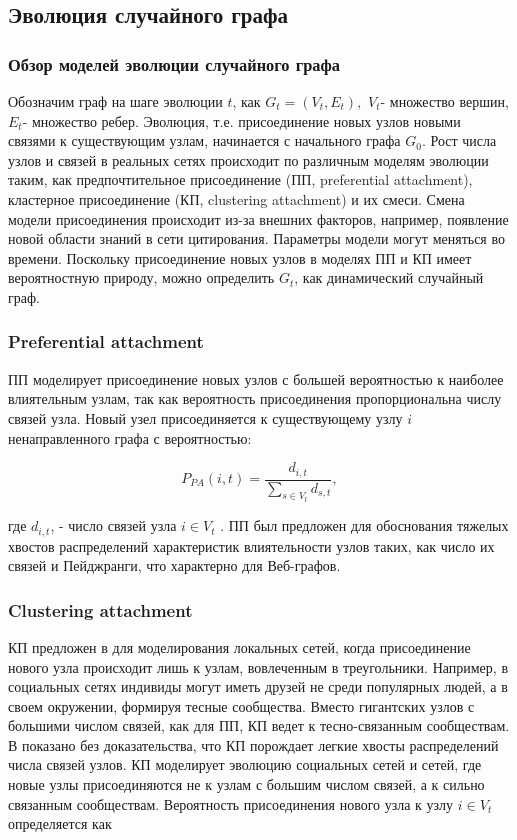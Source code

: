 \documentclass[a4paper,12pt]{article}
\begin{document}
\subsection{Эволюция случайного графа}
\subsubsection{Обзор моделей эволюции случайного графа}
	Обозначим граф на шаге эволюции $t$, как $G_{t}=(V_{t},E_{t}),$ $V_{t}$- множество вершин, $E_{t}$- множество ребер. Эволюция, т.е. присоединение новых узлов новыми связями к существующим узлам, начинается с начального графа $G_{0}$. Рост числа узлов и связей в реальных сетях происходит по различным моделям эволюции таким, как предпочтительное присоединение (ПП, preferential attachment), кластерное присоединение (КП, clustering attachment) и их смеси. Смена модели присоединения происходит из-за внешних факторов, например, появление новой области знаний в сети цитирования. Параметры модели могут меняться во времени. Поскольку присоединение новых узлов в моделях ПП и КП имеет вероятностную природу, можно определить $G_{t}$, как динамический случайный граф.
	

\subsubsection{Preferential attachment}
	ПП моделирует присоединение новых узлов с большей вероятностью к наиболее влиятельным узлам, так как вероятность присоединения пропорциональна числу связей узла. Новый узел присоединяется к существующему узлу $i$ ненаправленного графа с вероятностью:

\begin{equation}\label{F1}
P_{PA}(i,t) = \dfrac{d_{i,t}}{\sum\limits_{s \in V_{t}} d_{s,t}},
\end{equation}

где $d_{i,t}$, - число связей узла $i \in V_{t}$ . ПП был предложен для
обоснования тяжелых хвостов распределений характеристик влиятельности узлов таких, как число их связей и Пейджранги, что характерно для Веб-графов.


\subsubsection{Clustering attachment}

	КП предложен в \cite{book6} для моделирования локальных сетей, когда присоединение нового узла происходит лишь к узлам, вовлеченным в треугольники. Например, в социальных сетях индивиды могут иметь друзей не среди популярных людей, а в своем окружении, формируя тесные сообщества. Вместо гигантских узлов с большими числом связей, как для ПП, КП ведет к тесно-связанным сообществам. В показано без доказательства, что КП порождает легкие хвосты распределений числа связей узлов. КП моделирует эволюцию социальных сетей и сетей, где новые узлы присоединяются не к узлам
с большим числом связей, а к сильно связанным сообществам. Вероятность присоединения нового узла к узлу $i \in V_{t} $ определяется как
\end{document}
